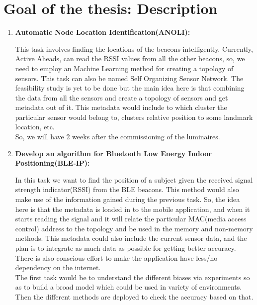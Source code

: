 \section{Goal of the thesis: Description}
\begin{enumerate}
\item \textbf{Automatic Node Location Identification(ANOLI):}
\begin{addmargin}[0em]{0em}%
This task involves finding the locations of the beacons intelligently. Currently, Active Aheads, can read the RSSI values from all the other beacons, so, we need to employ an Machine Learning method for creating a topology of sensors. This task can also be named Self Organizing Sensor Network. The feasibility study is yet to be done but the main idea here is that combining the data from all the sensors and create a topology of sensors and get metadata out of it. This metadata would include to which cluster the particular sensor would belong to, clusters relative position to some landmark location, etc. \cite{raivisto} \\
So, we will have 2 weeks after the commissioning of the luminaires. 

\end{addmargin}

\item \textbf{Develop an algorithm for Bluetooth Low Energy Indoor Positioning(BLE-IP):}
\begin{addmargin}[0em]{0em}%
In this task we want to find the position of a subject given the received signal strength indicator(RSSI) from the BLE beacons. This method would also make use of the information gained during the previous task. So, the idea here is that the metadata is loaded in to the mobile application, and when it starts reading the signal and it will relate the particular MAC(media access control) address to the topology and be used in the memory and non-memory methods. This metadata could also include the current sensor data, and the plan is to integrate as much data as possible for getting better accuracy. There is also conscious effort to make the application have less/no dependency on the internet. \\
The first task would be to understand the different biases via experiments so as to build a broad model which could be used in variety of environments. Then the different methods are deployed to check the accuracy based on that.\\


\end{addmargin}
\end{enumerate}
